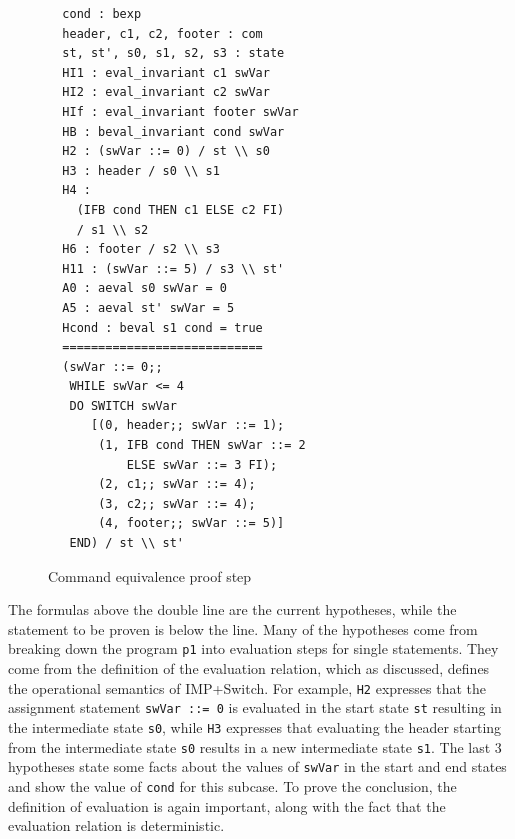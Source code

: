\documentclass[compsoc,conference,a4paper,10pt,times]{IEEEtran}
\begin{document}
\begin{figure}
\begin{verbatim}
  cond : bexp
  header, c1, c2, footer : com
  st, st', s0, s1, s2, s3 : state
  HI1 : eval_invariant c1 swVar
  HI2 : eval_invariant c2 swVar
  HIf : eval_invariant footer swVar
  HB : beval_invariant cond swVar
  H2 : (swVar ::= 0) / st \\ s0
  H3 : header / s0 \\ s1
  H4 : 
    (IFB cond THEN c1 ELSE c2 FI) 
    / s1 \\ s2
  H6 : footer / s2 \\ s3
  H11 : (swVar ::= 5) / s3 \\ st'
  A0 : aeval s0 swVar = 0
  A5 : aeval st' swVar = 5
  Hcond : beval s1 cond = true
  ============================
  (swVar ::= 0;;
   WHILE swVar <= 4
   DO SWITCH swVar
      [(0, header;; swVar ::= 1);
       (1, IFB cond THEN swVar ::= 2 
           ELSE swVar ::= 3 FI);
       (2, c1;; swVar ::= 4);
       (3, c2;; swVar ::= 4);
       (4, footer;; swVar ::= 5)]
   END) / st \\ st'
\end{verbatim}
\caption{Command equivalence proof step}
    \label{comequiproof}
\end{figure}

The formulas above the double line are the current hypotheses, while the statement to be proven is below the line. Many of the hypotheses come from breaking down the program \texttt{p1} into evaluation steps for single statements. They come from the definition of the evaluation relation, which as discussed, defines the operational semantics of IMP+Switch.  For example, \texttt{H2} expresses that the assignment statement \texttt{swVar ::= 0} is evaluated in the start state \texttt{st} resulting in the intermediate state \texttt{s0}, while \texttt{H3} expresses that evaluating the header starting from the intermediate state \texttt{s0} results in a new intermediate state \texttt{s1}.  The last 3 hypotheses state some facts about the values of \texttt{swVar} in the start and end states and show the value of \texttt{cond} for this subcase. To prove the conclusion, the definition of evaluation is again important, along with the fact that the evaluation relation is deterministic.
\end{document}
